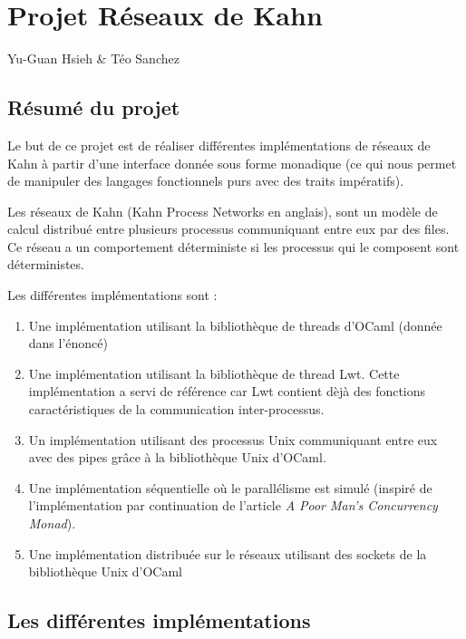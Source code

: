 \documentclass[]{scrartcl}
\date{}
\title{}
\author{}
\begin{document}
\section{Projet Réseaux de Kahn}\label{projet-ruxe9seaux-de-kahn}

Yu-Guan Hsieh \& Téo Sanchez

\subsection{Résumé du projet}\label{ruxe9sumuxe9-du-projet}

Le but de ce projet est de réaliser différentes implémentations de
réseaux de Kahn à partir d'une interface donnée sous forme monadique (ce
qui nous permet de manipuler des langages fonctionnels purs avec des
traits impératifs).

Les réseaux de Kahn (Kahn Process Networks en anglais), sont un modèle
de calcul distribué entre plusieurs processus communiquant entre eux par
des files. Ce réseau a un comportement déterministe si les processus qui
le composent sont déterministes.

Les différentes implémentations sont :

\begin{enumerate}
\def\labelenumi{\arabic{enumi}.}
\itemsep1pt\parskip0pt
\item
  Une implémentation utilisant la bibliothèque de threads d'OCaml
  (donnée dans l'énoncé)
\item
  Une implémentation utilisant la bibliothèque de thread Lwt. Cette
  implémentation a servi de référence car Lwt contient dèjà des
  fonctions caractéristiques de la communication inter-processus.
\item
  Un implémentation utilisant des processus Unix communiquant entre eux
  avec des pipes grâce à la bibliothèque Unix d'OCaml.
\item
  Une implémentation séquentielle où le parallélisme est simulé (inspiré
  de l'implémentation par continuation de l'article \emph{A Poor Man's
  Concurrency Monad}).
\item
  Une implémentation distribuée sur le réseaux utilisant des sockets de
  la bibliothèque Unix d'OCaml
\end{enumerate}

\subsection{Les différentes
implémentations}\label{les-diffuxe9rentes-impluxe9mentations}
\end{document}

